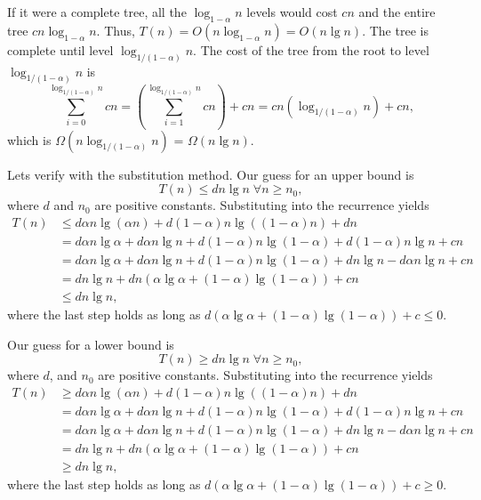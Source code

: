 \documentclass{report}
\makeatletter
\renewenvironment{framed}{%
 \def\FrameCommand##1{\hskip\@totalleftmargin
 \fboxsep=\FrameSep\fbox{##1}}%
 \MakeFramed {\advance\hsize-\width
   \@totalleftmargin\z@ \linewidth\hsize
   \@setminipage}}%
 {\par\unskip\endMakeFramed}
\DeclareMathOperator{\Forall}{\forall}
\makeatother
\begin{document}
\begin{enumerate}
\begin{framed}
If it were a complete tree, all the $\log_{1 - \alpha} n$ levels would cost $cn$
and the entire tree $cn \log_{1 - \alpha} n$. Thus,
$T(n) = O(n \log_{1 - \alpha} n) = O(n \lg n)$. The tree is complete until level
$\log_{1/(1 - \alpha)} n$. The cost of the tree from the root to level
$\log_{1/(1 - \alpha)} n$ is
\[
  \sum_{i = 0}^{\log_{1/(1 - \alpha)} n} cn
  = \left(\sum_{i = 1}^{\log_{1/(1 - \alpha)} n} cn\right) + cn
  = cn (\log_{1/(1 - \alpha)} n) + cn,
\]
which is $\Omega(n \log_{1/(1 - \alpha)} n)$ = $\Omega(n \lg n)$.

Lets verify with the substitution method. Our guess for an upper bound is
\[
T(n) \le d n \lg n \; \Forall n \ge n_0,
\]
where $d$ and $n_0$ are positive constants. Substituting into the
recurrence yields
\begin{equation*}
\begin{aligned}
  T(n) &\le d \alpha n \lg (\alpha n) + d (1 - \alpha) n \lg ((1 - \alpha) n) + dn\\
       &=   d \alpha n \lg \alpha + d \alpha n \lg n + d (1 - \alpha) n \lg (1 - \alpha) + d (1 - \alpha) n \lg n + cn\\
       &=   d \alpha n \lg \alpha + d \alpha n \lg n + d (1 - \alpha) n \lg (1 - \alpha) + d n \lg n - d \alpha n \lg n + cn\\
       &=   d n \lg n + dn (\alpha \lg \alpha + (1 - \alpha) \lg (1 - \alpha)) + cn\\
       &\le d n \lg n,
\end{aligned}
\end{equation*}
where the last step holds as long as $d(\alpha \lg \alpha + (1 - \alpha) \lg (1 - \alpha)) + c \le 0$.

Our guess for a lower bound is
\[
  T(n) \ge d n \lg n \; \Forall n \ge n_0,
\]
where $d$, and $n_0$ are positive constants. Substituting into the
recurrence yields
\begin{equation*}
\begin{aligned}
  T(n) &\ge d \alpha n \lg (\alpha n) + d (1 - \alpha) n \lg ((1 - \alpha) n) + dn\\
       &=   d \alpha n \lg \alpha + d \alpha n \lg n + d (1 - \alpha) n \lg (1 - \alpha) + d (1 - \alpha) n \lg n + cn\\
       &=   d \alpha n \lg \alpha + d \alpha n \lg n + d (1 - \alpha) n \lg (1 - \alpha) + d n \lg n - d \alpha n \lg n + cn\\
       &=   d n \lg n + dn (\alpha \lg \alpha + (1 - \alpha) \lg (1 - \alpha)) + cn\\
       &\ge d n \lg n,
\end{aligned}
\end{equation*}
where the last step holds as long as $d(\alpha \lg \alpha + (1 - \alpha) \lg (1 - \alpha)) + c \ge 0$.
\end{framed}

\end{enumerate}
\end{document}

